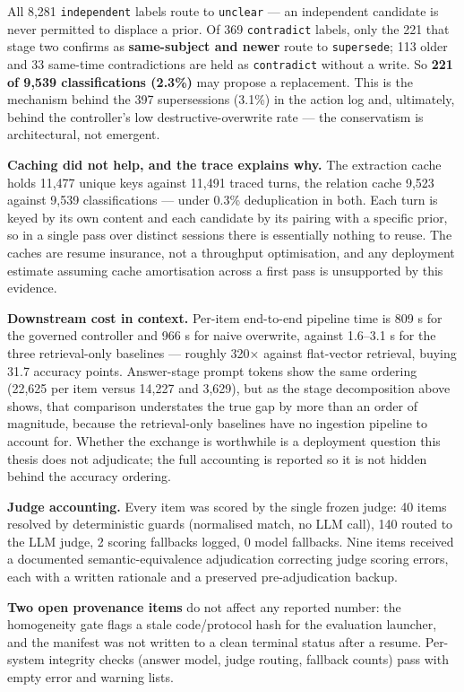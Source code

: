All 8,281 \texttt{independent} labels route to \texttt{unclear} --- an
independent candidate is never permitted to displace a prior. Of 369
\texttt{contradict} labels, only the 221 that stage two confirms as
\textbf{same-subject and newer} route to \texttt{supersede}; 113 older
and 33 same-time contradictions are held as \texttt{contradict} without
a write. So \textbf{221 of 9,539 classifications (2.3\%)} may propose a
replacement. This is the mechanism behind the 397 supersessions (3.1\%)
in the action log and, ultimately, behind the controller's low
destructive-overwrite rate --- the conservatism is architectural, not
emergent.

\textbf{Caching did not help, and the trace explains why.} The
extraction cache holds 11,477 unique keys against 11,491 traced turns,
the relation cache 9,523 against 9,539 classifications --- under 0.3\%
deduplication in both. Each turn is keyed by its own content and each
candidate by its pairing with a specific prior, so in a single pass over
distinct sessions there is essentially nothing to reuse. The caches are
resume insurance, not a throughput optimisation, and any deployment
estimate assuming cache amortisation across a first pass is unsupported
by this evidence.

\textbf{Downstream cost in context.} Per-item end-to-end pipeline time
is 809 s for the governed controller and 966 s for naive overwrite,
against 1.6--3.1 s for the three retrieval-only baselines --- roughly
320× against flat-vector retrieval, buying 31.7 accuracy points.
Answer-stage prompt tokens show the same ordering (22,625 per item
versus 14,227 and 3,629), but as the stage decomposition above shows,
that comparison understates the true gap by more than an order of
magnitude, because the retrieval-only baselines have no ingestion
pipeline to account for. Whether the exchange is worthwhile is a
deployment question this thesis does not adjudicate; the full accounting
is reported so it is not hidden behind the accuracy ordering.

\textbf{Judge accounting.} Every item was scored by the single frozen
judge: 40 items resolved by deterministic guards (normalised match, no
LLM call), 140 routed to the LLM judge, 2 scoring fallbacks logged, 0
model fallbacks. Nine items received a documented semantic-equivalence
adjudication correcting judge scoring errors, each with a written
rationale and a preserved pre-adjudication backup.

\textbf{Two open provenance items} do not affect any reported number:
the homogeneity gate flags a stale code/protocol hash for the evaluation
launcher, and the manifest was not written to a clean terminal status
after a resume. Per-system integrity checks (answer model, judge
routing, fallback counts) pass with empty error and warning lists.
